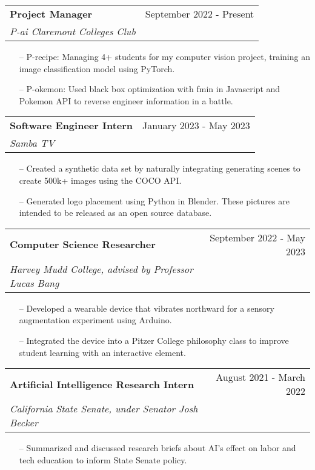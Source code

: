 \documentclass[letterpaper,10pt]{article}
\makeatletter
\newcommand{\resumeSubheading}[4]{
  \vspace{-2pt}\item
    \begin{tabular*}{0.97\textwidth}[t]{l@{\extracolsep{\fill}}r}
      \textbf{#1} & #2 \\
      \textit{\small#3} & \textit{\small #4} \\
    \end{tabular*}\vspace{-7pt}
}
\makeatother
\begin{document}
    \resumeSubheading
      {Project Manager}{September 2022 - Present}
      {P-ai Claremont Colleges Club}{}
      \begin{itemize}\small
      \setlength\itemsep{0em}
        \item[--] P-recipe: Managing 4+ students for my computer vision project, training an image classification model using PyTorch.
        \item[--] P-okemon: Used black box optimization with fmin in Javascript and Pokemon API to reverse engineer information in a battle.

      \end{itemize}

    \resumeSubheading
      {Software Engineer Intern}{January 2023 - May 2023}
      {Samba TV}{}
      \begin{itemize}\small
      \setlength\itemsep{0em}
        \item[--] Created a synthetic data set by naturally integrating generating scenes to create 500k+ images using the COCO API.
        \item[--] Generated logo placement using Python in Blender. These pictures are intended to be released as an open source database.

      \end{itemize}
    \resumeSubheading
      {Computer Science Researcher}{September 2022 - May 2023}
      {Harvey Mudd College, advised by Professor Lucas Bang}{}
      \begin{itemize}\small
      \setlength\itemsep{0em}
        \item[--] Developed a wearable device that vibrates northward for a sensory augmentation experiment using Arduino.
        \item[--] Integrated the device into a Pitzer College philosophy class to improve student learning with an interactive element.

      \end{itemize}

    
    \resumeSubheading
      {Artificial Intelligence Research Intern}{August 2021 - March 2022}
      {California State Senate, under Senator Josh Becker}{}
      \begin{itemize}\small
      \setlength\itemsep{0em}
        \item[--] Summarized and discussed research briefs about AI’s effect on labor and tech education to inform State Senate policy.

      \end{itemize}
      
\end{document}
